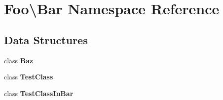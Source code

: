 \section{Foo\textbackslash{}Bar Namespace Reference}
\label{namespace_foo_1_1_bar}
\subsection*{Data Structures}
\begin{DoxyCompactItemize}
\item 
class {\bf Baz}
\item 
class {\bf Test\+Class}
\item 
class {\bf Test\+Class\+In\+Bar}
\end{DoxyCompactItemize}
